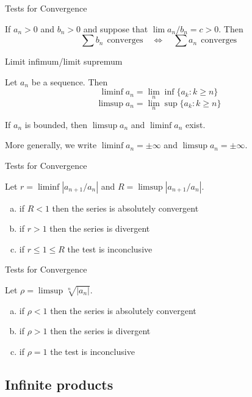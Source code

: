 \documentclass{beamer}
\begin{document}
\begin{frame}{Tests for Convergence}
\begin{thm}
If $a_n>0$ and $b_n > 0$ and suppose that $\lim a_n/b_n = c > 0$.  Then
$$\sum b_n\ \ \text{converges}\quad \Leftrightarrow\quad\sum a_n\ \ \text{converges}$$
\end{thm}
\end{frame}

\begin{frame}{Limit infimum/limit supremum}
\begin{defn}
Let $a_n$ be a sequence.  Then
$$\liminf a_n = \lim_n \inf\{a_k: k\geq n\}$$
$$\limsup a_n = \lim_n \sup\{a_k: k\geq n\}$$
\end{defn}
\begin{thm}
If $a_n$ is bounded, then $\limsup a_n$ and $\liminf a_n$ exist.
\end{thm}
More generally, we write $\liminf a_n = \pm\infty$ and $\limsup a_n = \pm \infty$.
\end{frame}

\begin{frame}{Tests for Convergence}
\begin{thm}
Let $r = \liminf |a_{n+1}/a_n|$ and $R = \limsup |a_{n+1}/a_n|$.
\begin{enumerate}[(a)]
\item if $R < 1$ then the series is absolutely convergent
\item if $r > 1$ then the series is divergent
\item if $r \leq 1\leq R$ the test is inconclusive
\end{enumerate}
\end{thm}
\end{frame}

\begin{frame}{Tests for Convergence}
\begin{thm}
Let $\rho = \limsup \sqrt[n]{|a_n|}$.
\begin{enumerate}[(a)]
\item if $\rho < 1$ then the series is absolutely convergent
\item if $\rho > 1$ then the series is divergent
\item if $\rho = 1$ the test is inconclusive
\end{enumerate}
\end{thm}
\end{frame}

\subsection{Infinite products}
\end{document}
